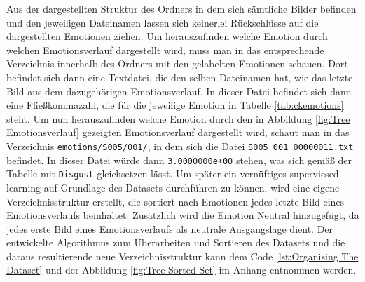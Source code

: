 \documentclass[12pt, a4paper]{report}
\begin{document}
Aus der dargestellten Struktur des Ordners in dem sich sämtliche Bilder befinden und den jeweiligen Dateinamen lassen sich keinerlei Rückschlüsse auf die dargestellten Emotionen ziehen. Um herauszufinden welche Emotion durch welchen Emotionsverlauf dargestellt wird, muss man in das entsprechende Verzeichnis innerhalb des Ordners mit den gelabelten Emotionen schauen. Dort befindet sich dann eine Textdatei, die den selben Dateinamen hat, wie das letzte Bild aus dem dazugehörigen Emotionsverlauf. In dieser Datei befindet sich dann eine Fließkommazahl, die für die jeweilige Emotion in Tabelle \ref{tab:ckemotions} steht. Um nun herauszufinden welche Emotion durch den in Abbildung \ref{fig:Tree Emotionsverlauf} gezeigten Emotionsverlauf dargestellt wird, schaut man in das Verzeichnis \texttt{emotions/S005/001/}, in dem sich die Datei \texttt{S005\_001\_00000011.txt} befindet. In dieser Datei würde dann \texttt{3.0000000e+00} stehen, was sich gemäß der Tabelle mit \texttt{Disgust} gleichsetzen lässt.\newline
Um später ein vernüftiges superviesed learning auf Grundlage des Datasets durchführen zu können, wird eine eigene Verzeichnisstruktur erstellt, die sortiert nach Emotionen jedes letzte Bild eines Emotionsverlaufs beinhaltet. Zusätzlich wird die Emotion Neutral hinzugefügt, da jedes erste Bild eines Emotionsverlaufs als neutrale Ausgangslage dient. Der entwickelte Algorithmus zum Überarbeiten und Sortieren des Datasets und die daraus resultierende neue Verzeichnisstruktur kann dem Code \ref{lst:Organising The Dataset} und der Abbildung \ref{fig:Tree Sorted Set} im Anhang entnommen werden.
\end{document}
